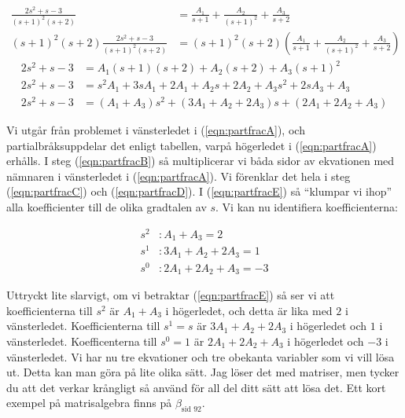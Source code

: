 \documentclass[a4paper]{article}
\newcommand{\mhb}[1]{$\beta_{\text{#1}}$}     %
\begin{document}
\begin{align}
  \frac{2s^2 + s -3}{(s+1)^2(s+2)} &= \frac{A_1}{s+1} + \frac{A_2}{(s+1)^2} + \frac{A_3}{s+2} \label{eqn:partfracA}\\
  (s+1)^2(s+2) \frac{2s^2 + s -3}{(s+1)^2(s+2)} &= (s+1)^2(s+2) \left( \frac{A_1}{s+1} + \frac{A_2}{(s+1)^2} + \frac{A_3}{s+2} \right) \label{eqn:partfracB}
\end{align}
\vspace{-7mm}
\begin{align}
  2s^2 + s -3 &= A_1(s+1)(s+2) + A_2(s+2) + A_3(s+1)^2 \label{eqn:partfracC}\\
  2s^2 + s -3 &= s^2A_1 + 3sA_1 + 2A_1 + A_2s + 2A_2 + A_3s^2 + 2sA_3 + A_3 \label{eqn:partfracD}\\
  2s^2 + s -3 &= (A_1 + A_3)s^2 + (3A_1 + A_2 + 2A_3)s + (2A_1 + 2A_2 + A_3) \label{eqn:partfracE}
\end{align}

Vi utgår från problemet i vänsterledet i (\ref{eqn:partfracA}), och partialbråksuppdelar det enligt tabellen, varpå högerledet i (\ref{eqn:partfracA}) erhålls. I steg (\ref{eqn:partfracB}) så multiplicerar vi båda sidor av ekvationen med nämnaren i vänsterledet i (\ref{eqn:partfracA}). Vi förenklar det hela i steg (\ref{eqn:partfracC}) och (\ref{eqn:partfracD}). I (\ref{eqn:partfracE}) så ``klumpar vi ihop'' alla koefficienter till de olika gradtalen av $s$. Vi kan nu identifiera koefficienterna:

\begin{align*}
  s^2 &: A_1 + A_3 = 2\\
  s^1 &: 3A_1 + A_2 + 2A_3 = 1\\
  s^0 &: 2A_1 + 2A_2 + A_3 = -3
\end{align*}

Uttryckt lite slarvigt, om vi betraktar (\ref{eqn:partfracE}) så ser vi att koefficienterna till $s^2$ är $A_1 + A_3$ i högerledet, och detta är lika med $2$ i vänsterledet. Koefficienterna till $s^1 = s$ är $3A_1 + A_2 + 2A_3$ i högerledet och $1$ i vänsterledet. Koefficenterna till $s^0 = 1$ är $2A_1 + 2A_2 + A_3$ i högerledet och $-3$ i vänsterledet. Vi har nu tre ekvationer och tre obekanta variabler som vi vill lösa ut. Detta kan man göra på lite olika sätt. Jag löser det med matriser, men tycker du att det verkar krångligt så använd för all del ditt sätt att lösa det. Ett kort exempel på matrisalgebra finns på \mhb{sid 92}.
\end{document}
